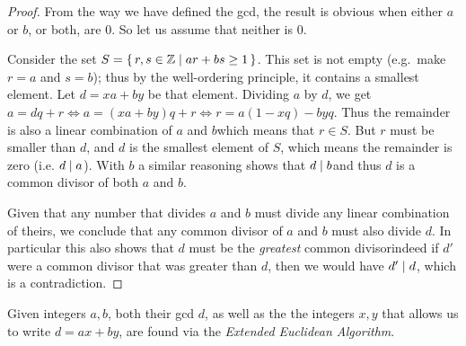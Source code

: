   \begin{proof}
    From the way we have defined the gcd, the result is obvious when either $a$ or $b$, or both, are $0$. So let us assume that neither is $0$. 

    Consider the set $S=\set{r, s \in \mathbb{Z} | ar+bs \ge 1}$. This set is not empty (e.g.\ make $r=a$ and $s=b$); thus by the well-ordering principle, it contains a smallest element. Let $d=xa+by$ be that element. Dividing $a$ by $d$, we get $a = dq+r \Leftrightarrow a = (xa+by)q+r \Leftrightarrow r = a(1-xq) - byq$. Thus the remainder is also a linear combination of $a$ and $b$\emd which means that $r \in S$. But $r$ must be smaller than $d$, and $d$ is the smallest element of $S$, which means the remainder is zero (i.e. $d\mathrel{|} a$). With $b$ a similar reasoning shows that $d\mathrel{|} b$\emd and thus $d$ is a common divisor of both $a$ and $b$.

    Given that any number that divides $a$ and $b$ must divide any linear combination of theirs, we conclude that any common divisor of $a$ and $b$ must also divide $d$. In particular this also shows that $d$ must be the \emph{greatest} common divisor\emd indeed if $d'$ were a common divisor that was greater than $d$, then we would have $d'\mathrel{|} d$, which is a contradiction.
  \end{proof}

  \begin{remark}
    \label{rem:eea}
    Given integers $a, b$, both their gcd $d$, as well as the the integers $x, y$ that allows us to write $d = ax + by$, are found via the \emph{Extended Euclidean Algorithm}.
  \end{remark}

